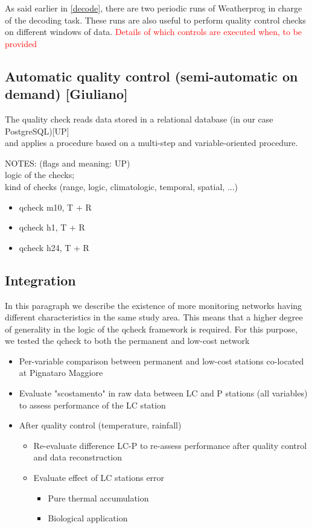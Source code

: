 \documentclass[authoryear,preprint,review,12pt]{elsarticle}
\begin{document}
As said earlier in \cref{decode}, there are two periodic runs of Weatherprog in charge of the decoding task. These runs are also useful to perform quality control checks on different windows of data. \textcolor{red}{Details of which controls are executed when, to be provided}

\subsection{Automatic quality control (semi-automatic on demand) [Giuliano]}
The quality check reads data stored in a relational database (in our case PostgreSQL)[UP]\\
and applies a procedure based on a multi-step and variable-oriented procedure.

NOTES: (flags and meaning: UP)\\
logic of the checks;\\
kind of checks (range, logic, climatologic, temporal, spatial, ...)

\begin{itemize}
    \item qcheck m10, T + R
    \item qcheck h1,  T + R
    \item qcheck h24, T + R
\end{itemize}

\subsection{Integration}\label{Integration}
In this paragraph we describe the existence of more monitoring networks having different characteristics in the same study area.
This means that a higher degree of generality in the logic of the qcheck framework is required.
For this purpose, we tested the qcheck to both the permanent and low-cost network
\begin{itemize}
    \item Per-variable comparison between permanent and low-cost stations co-located at Pignataro Maggiore
    \item Evaluate "scostamento" in raw data between LC and P stations (all variables) to assess performance of the LC station
    \item After quality control (temperature, rainfall)
    \begin{itemize}
        \item Re-evaluate difference LC-P to re-assess performance after quality control and data reconstruction 
        \item Evaluate effect of LC stations error
        \begin{itemize}
            \item Pure thermal accumulation
            \item Biological application
        \end{itemize}
    \end{itemize}
\end{itemize}
\end{document}
